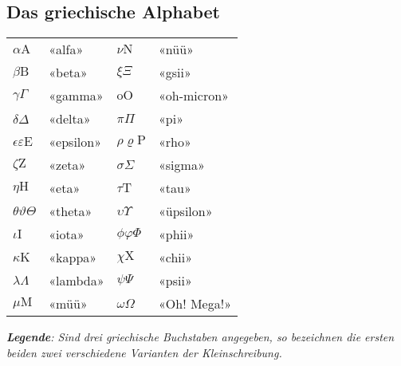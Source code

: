 %
%

\subsection{Das griechische Alphabet}

\vspace{4mm}


\begin{tabular}{ll|ll}
  
  $\alpha \text{A}$                & «alfa»    & $\nu \text{N}$            & «nüü»       \\
  $\beta \text{B}$                 & «beta»    & $\xi \Xi$                   & «gsii»      \\
  $\gamma \Gamma$                    & «gamma»   & $\text{o} \text{O}$     & «oh-micron» \\    
  $\delta \Delta$                    & «delta»   & $\pi \Pi$                   & «pi»        \\    
  $\epsilon \varepsilon \text{E}$  & «epsilon» & $\rho \varrho \text{P}$   & «rho»       \\    
  $\zeta \text{Z}$                 & «zeta»    & $\sigma \Sigma$             & «sigma»     \\    
  $\eta \text{H}$                  & «eta»     & $\tau \text{T}$           & «tau»       \\    
  $\theta \vartheta \Theta$          & «theta»   & $\upsilon \Upsilon$         & «üpsilon»   \\    
  $\iota \text{I}$                 & «iota»    & $\phi \varphi \Phi$         & «phii»      \\    
  $\kappa \text{K}$                & «kappa»   & $\chi \text{X}$           & «chii»      \\    
  $\lambda \Lambda$                  & «lambda»  & $\psi \Psi$                 & «psii»      \\    
  $\mu \text{M}$                   & «müü»     & $\omega \Omega$             & «Oh! Mega!» \\    
\end{tabular}

\textit{\textbf{Legende}: Sind drei griechische Buchstaben angegeben, so bezeichnen die
ersten beiden zwei verschiedene Varianten der Kleinschreibung.}
\newpage
